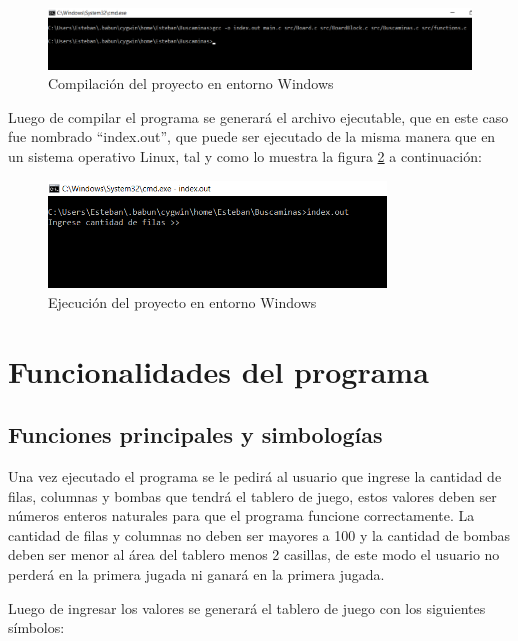 \documentclass[letterpaper,12pt]{report}
\begin{document}
\begin{figure}[H]
    \centering
    \includegraphics[width=1\textwidth]{gccWin.png}
    \caption{Compilación del proyecto en entorno Windows}
    \label{fig:gccWin}
\end{figure}

Luego de compilar el programa se generará el archivo ejecutable, que en este caso fue nombrado ``index.out'', que puede ser ejecutado de la misma manera que en un sistema operativo Linux, tal y como lo muestra la figura \ref{fig:ejecWin} a continuación:

\begin{figure}[H]
    \centering
    \includegraphics[width=0.8\textwidth]{ejecWin.png}
    \caption{Ejecución del proyecto en entorno Windows}
    \label{fig:ejecWin}
\end{figure}

\chapter{Funcionalidades del programa}

\section {Funciones principales y simbologías}

Una vez ejecutado el programa se le pedirá al usuario que ingrese la cantidad de filas, columnas y bombas que tendrá el tablero de juego, estos valores deben ser números enteros naturales para que el programa funcione correctamente. La cantidad de filas y columnas no deben ser mayores a 100 y la cantidad de bombas deben ser menor al área del tablero menos 2 casillas, de este modo el usuario no perderá en la primera jugada ni ganará en la primera jugada.

Luego de ingresar los valores se generará el tablero de juego con los siguientes símbolos:
\end{document}
